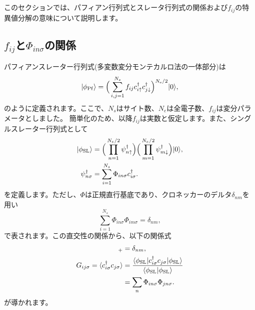 \section{}
\label{sec:PuffAndSlater}
このセクションでは、パフィアン行列式とスレータ行列式の関係および$f_{ij}$の特異値分解の意味について説明します。
\subsection{$f_{ij}$と$\Phi_{in\sigma}$の関係}
パフィアンスレーター行列式(多変数変分モンテカルロ法の一体部分)は
\begin{equation}
|\phi_{\rm Pf}\rangle=\Big(\sum_{i,j=1}^{N_{s}}f_{ij}c_{i\uparrow}^{\dagger}c_{j\downarrow}^{\dagger}\Big)^{N_{\rm e}/2}|0\rangle,
\end{equation}
のように定義されます。ここで、$N_{s}$はサイト数、$N_{e}$は全電子数、$f_{ij}$は変分パラメータとしました。
簡単化のため、以降$f_{ij}$は実数と仮定します。また、シングルスレーター行列式として
\begin{align}
|\phi_{\rm SL}\rangle&=\Big(\prod_{n=1}^{N_{e}/2}\psi_{n\uparrow}^{\dagger}\Big)
\Big(\prod_{m=1}^{N_{e}/2}\psi_{m\downarrow}^{\dagger}\Big)|0\rangle, \\
\psi_{n\sigma}^{\dagger}&=\sum_{i=1}^{N_{s}}\Phi_{in\sigma}c^{\dagger}_{i\sigma}.
\end{align}
を定義します。ただし、$\Phi$は正規直行基底であり、クロネッカーのデルタ$\delta_{nm}$を用い
\begin{equation}
\sum_{i=1}^{N_{s}}\Phi_{in\sigma}\Phi_{im\sigma}=\delta_{nm},
\end{equation}
で表されます。この直交性の関係から、以下の関係式
\begin{align}
[\psi^{\dagger}_{n\sigma},\psi_{m\sigma}]_{+}&=\delta_{nm},\\
G_{ij\sigma}=\langle c_{i\sigma}^{\dagger}c_{j\sigma}\rangle 
&=\frac{\langle \phi_{\rm SL}| c_{i\sigma}^{\dagger}c_{j\sigma} | \phi_{\rm SL}\rangle}{\langle \phi_{\rm SL}|\phi_{\rm SL}\rangle } \\
&=\sum_{n} \Phi_{in\sigma} \Phi_{jn\sigma}.
\end{align}
が導かれます。

